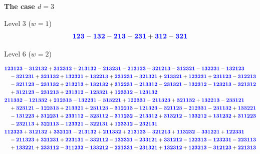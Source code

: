 \documentclass{scrartcl}
\theoremstyle{plain}
\theoremstyle{definition}
\newcommand{\1}[1]{1_{\{#1\}}}
\newcommand{\ds}{d} %
\def\word#1{{\color{blue}\mathbf{#1}}}
\begin{document}
\textbf{The case $\ds=3$}

Level $3$ ($w=1$)
\begin{align*}
  \word{123} - \word{132} - \word{213} + \word{231} + \word{312} - \word{321}
\end{align*}

Level $6$ ($w=2$)
\begin{scriptsize}
\begin{align*}
  & \word{123123} - \word{312132} + \word{312312} + \word{213132} - \word{213231} - \word{213123} + \word{321213} - \word{312321} - \word{132231} - \word{132123} \\
  &\quad - \word{321231} + \word{321132} + \word{132321} + \word{132213} + \word{231231} + \word{321321} + \word{213321} + \word{123231} + \word{231123} - \word{312213}\\
  &\quad - \word{321123} - \word{231132} + \word{213213} + \word{132132} + \word{312231} - \word{213312} - \word{231321} - \word{132312} - \word{123213} - \word{321312}\\
  &\quad + \word{312123} - \word{231213} + \word{231312} - \word{123321} + \word{123312} - \word{123132} \\
  & \word{211332} - \word{121332} + \word{212313} - \word{132231} - \word{313221} + \word{122331} - \word{211323} + \word{321132} + \word{132213} - \word{233121}\\
  &\quad + \word{323121} - \word{122313} + \word{213321} + \word{231123} - \word{312213} + \word{121323} - \word{321123} - \word{212331} - \word{231132} + \word{133221}\\
  &\quad - \word{131223} + \word{312231} + \word{233112} - \word{323112} - \word{311232} - \word{213312} + \word{313212} - \word{133212} + \word{131232} + \word{311223}\\
  &\quad - \word{232113} + \word{322113} - \word{123321} - \word{322131} + \word{123312} + \word{232131} \\
  & \word{112323} + \word{312132} + \word{332121} - \word{213132} + \word{211332} + \word{213123} - \word{321213} + \word{113232} - \word{331221} + \word{122331}\\
  &\quad - \word{211323} + \word{321231} + \word{223131} - \word{332112} - \word{132321} - \word{233121} + \word{331212} - \word{122313} - \word{123231} - \word{223113}\\
  &\quad + \word{133221} + \word{233112} - \word{311232} - \word{133212} - \word{221331} + \word{231321} + \word{132312} + \word{123213} - \word{312123} + \word{221313}\\

\end{align*}
\end{scriptsize}
\end{document}
